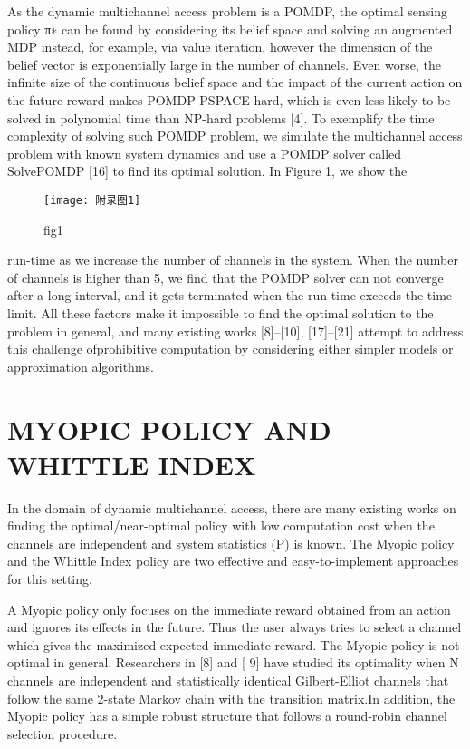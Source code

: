 As the dynamic multichannel access problem is a POMDP, the optimal sensing policy π∗ can be found by considering its belief space and solving an augmented MDP instead, for example, via value iteration, however the dimension of the belief vector is exponentially large in the number of channels. Even worse, the inﬁnite size of the continuous belief space and the impact of the current action on the future reward makes POMDP PSPACE-hard, which is even less likely to be solved in polynomial time than NP-hard problems [4]. To exemplify the time complexity of solving such POMDP problem, we simulate the multichannel access problem with known system dynamics and use a POMDP solver called SolvePOMDP [16] to ﬁnd its optimal solution. In Figure 1, we show the
\begin{figure}[h]
	\centering
	\texttt{[image: 附录图1]}
	\caption{fig1}
\end{figure}

 run-time as we increase the number of channels in the system. When the number of channels is higher than 5, we ﬁnd that the POMDP solver can not converge after a long interval, and it gets terminated when the run-time exceeds the time limit. All these factors make it impossible to ﬁnd the optimal solution to the problem in general, and many existing works [8]–[10], [17]–[21] attempt to address this challenge ofprohibitive computation by considering either simpler models or approximation algorithms.

\section*{  MYOPIC POLICY AND WHITTLE INDEX   }
In the domain of dynamic multichannel access, there are many existing works on ﬁnding the optimal/near-optimal policy with low computation cost when the channels are independent and system statistics (P) is known. The Myopic policy and the Whittle Index policy are two effective and easy-to-implement approaches for this setting.

A Myopic policy only focuses on the immediate reward obtained from an action and ignores its effects in the future. Thus the user always tries to select a channel which gives the maximized expected immediate reward. The Myopic policy is not optimal in general. Researchers in [8] and [ 9] have studied its optimality when N channels are independent and statistically identical Gilbert-Elliot channels that follow the same 2-state Markov chain with the transition matrix.In addition, the Myopic policy has a simple robust structure that follows a round-robin channel selection procedure.


